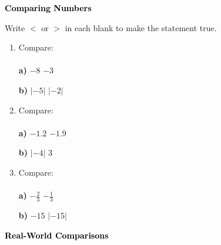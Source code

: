 \documentclass[12pt, letterpaper, fleqn]{article}
\newcommand{\blankshorter}{\underline{\hspace{1.5cm}}}
\begin{document}
\newpage

\begin{tcolorbox}[colback=black!10]
\large\textcolor{black}{\textbf{Comparing Numbers}}
\end{tcolorbox}

\noindent
Write $<$ or $>$ in each blank to make the statement true.

\vspace{3mm}

\begin{enumerate}[itemsep=2.2cm, leftmargin=0.6cm]

\item Compare: \\ \\
\textbf{a)} $-8$ \quad \blankshorter \quad $-3$ \\
\vspace{1cm}

\textbf{b)} $|-5|$ \quad \blankshorter \quad $|-2|$

\vspace{0.5cm}

\item Compare: \\ \\
\textbf{a)} $-1.2$ \quad \blankshorter \quad $-1.9$ \\
\vspace{1cm}

\textbf{b)} $|-4|$ \quad \blankshorter \quad $3$

\vspace{0.5cm}

\item Compare: \\ \\
\textbf{a)} $-\frac{2}{3}$ \quad \blankshorter \quad $-\frac{1}{3}$ \\
\vspace{1cm}

\textbf{b)} $-15$ \quad \blankshorter \quad $|-15|$

\vspace{0.5cm}

\end{enumerate}

\newpage

\begin{tcolorbox}[colback=black!10]
\large\textcolor{black}{\textbf{Real-World Comparisons}}
\end{tcolorbox}
\end{document}
